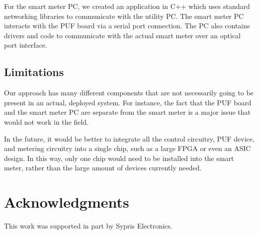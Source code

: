 For the smart meter PC, we created an application in C++ which uses standard networking libraries to communicate
with the utility PC. The smart meter PC interacts with the PUF board via a serial port connection. The PC also contains
drivers and code to communicate with the actual smart meter over an optical port interface.

\subsection{Limitations}
Our approach has many different components that are not necessarily going to be present in an actual, deployed
system. For instance, the fact that the PUF board and the smart meter PC are separate from the smart meter is
a major issue that would not work in the field. 

In the future, it would be better to integrate all the control circuitry,
PUF device, and metering circuitry into a single chip, such as a large FPGA or even an ASIC design. In this way, only
one chip would need to be installed into the smart meter, rather than the large amount of devices currently needed.

\section{Acknowledgments}
This work was supported in part by Sypris Electronics.